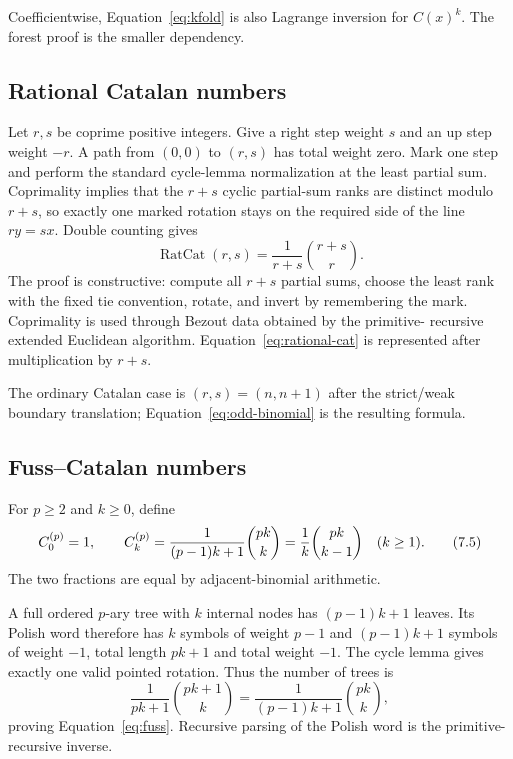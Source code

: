 Coefficientwise, Equation~\eqref{eq:kfold} is also Lagrange inversion for
$C(x)^k$.  The forest proof is the smaller \ipra{} dependency.

\subsection{Rational Catalan numbers}

Let $r,s$ be coprime positive integers.  Give a right step weight $s$ and an up
step weight $-r$.  A path from $(0,0)$ to $(r,s)$ has total weight zero.  Mark
one step and perform the standard cycle-lemma normalization at the least
partial sum.  Coprimality implies that the $r+s$ cyclic partial-sum ranks are
distinct modulo $r+s$, so exactly one marked rotation stays on the required
side of the line $ry=sx$.  Double counting gives
\[
 \operatorname{RatCat}(r,s)
 =\frac1{r+s}\binom{r+s}{r}.                                    \tag{7.4}\label{eq:rational-cat}
\]
The proof is constructive: compute all $r+s$ partial sums, choose the least
rank with the fixed tie convention, rotate, and invert by remembering the
mark.  Coprimality is used through Bezout data obtained by the primitive-
recursive extended Euclidean algorithm.  Equation~\eqref{eq:rational-cat}
is represented after multiplication by $r+s$.

The ordinary Catalan case is $(r,s)=(n,n+1)$ after the strict/weak boundary
translation; Equation~\eqref{eq:odd-binomial} is the resulting formula.

\subsection{Fuss--Catalan numbers}

For $p\ge2$ and $k\ge0$, define
\[
 C^{(p)}_0=1,
 \qquad
 C^{(p)}_k
 =\frac1{(p-1)k+1}\binom{pk}{k}
 =\frac1k\binom{pk}{k-1}\quad(k\ge1).                           \tag{7.5}\label{eq:fuss}
\]
The two fractions are equal by adjacent-binomial arithmetic.

A full ordered $p$-ary tree with $k$ internal nodes has $(p-1)k+1$ leaves.
Its Polish word therefore has $k$ symbols of weight $p-1$ and
$(p-1)k+1$ symbols of weight $-1$, total length $pk+1$ and total weight $-1$.
The cycle lemma gives exactly one valid pointed rotation.  Thus the number of
trees is
\[
 \frac1{pk+1}\binom{pk+1}{k}
 =\frac1{(p-1)k+1}\binom{pk}{k},
\]
proving Equation~\eqref{eq:fuss}.  Recursive parsing of the Polish word is the
primitive-recursive inverse.

